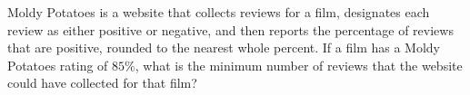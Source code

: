 Moldy Potatoes is a website that collects reviews for a film, designates each review as either positive or negative, and then reports the percentage of reviews that are positive, rounded to the nearest whole percent. If a film has a Moldy Potatoes rating of $85\%$, what is the minimum number of reviews that the website could have collected for that film?
